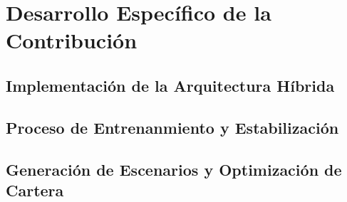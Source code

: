 \chapter{Desarrollo Específico de la Contribución}



\section{Implementación de la Arquitectura Híbrida}



\section{Proceso de Entrenanmiento y Estabilización}



\section{Generación de Escenarios y Optimización de Cartera}


